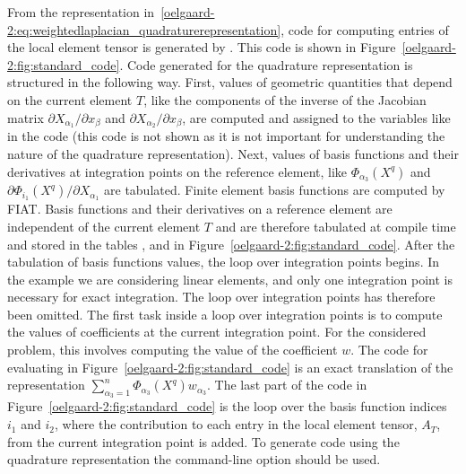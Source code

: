 From the representation
in~\eqref{oelgaard-2:eq:weightedlaplacian_quadraturerepresentation},
code for computing entries of the local element tensor is generated by
\ffc{}. This code is shown in
Figure~\ref{oelgaard-2:fig:standard_code}.  Code generated for the
quadrature representation is structured in the following way.  First,
values of geometric quantities that depend on the current element $T$,
like the components of the inverse of the Jacobian matrix $\partial
X_{\alpha_1} / \partial x_{\beta}$ and $\partial X_{\alpha_2}
/ \partial x_{\beta}$, are computed and assigned to the variables like
 in the code (this code is not shown as it is not important
for understanding the nature of the quadrature representation).  Next,
values of basis functions and their derivatives at integration points
on the reference element, like $\Phi_{\alpha_{3}}(X^q)$ and $\partial
\Phi_{i_1}(X^q) / \partial X_{\alpha_1}$ are tabulated.  Finite
element basis functions are computed by FIAT.  Basis functions and
their derivatives on a reference element are independent of the
current element $T$ and are therefore tabulated at compile time and
stored in the tables ,  and
 in Figure~\ref{oelgaard-2:fig:standard_code}.
After the tabulation of basis functions values, the loop over
integration points begins.  In the example we are considering linear
elements, and only one integration point is necessary for exact
integration. The loop over integration points has therefore been
omitted.  The first task inside a loop over integration points is to
compute the values of coefficients at the current integration point.
For the considered problem, this involves computing the value of the
coefficient $w$.  The code for evaluating  in
Figure~\ref{oelgaard-2:fig:standard_code} is an exact translation of
the representation $\sum_{\alpha_{3}=1}^n \Phi_{\alpha_{3}}(X^q)
w_{\alpha_{3}}$.  The last part of the code in
Figure~\ref{oelgaard-2:fig:standard_code} is the loop over the basis
function indices $i_{1}$ and $i_{2}$, where the contribution to each
entry in the local element tensor, $A_{T}$, from the current
integration point is added.
To generate code using the quadrature representation the \ffc{}
command-line option  should be used.
%
